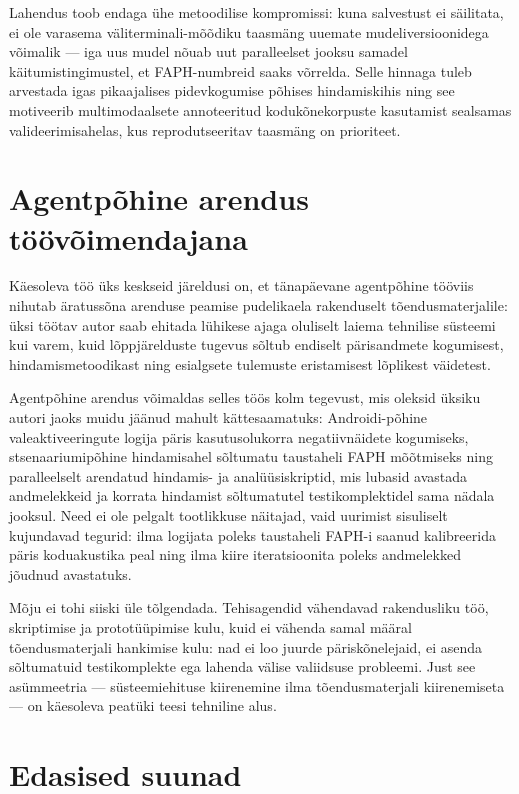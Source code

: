 Lahendus toob endaga ühe metoodilise kompromissi: kuna salvestust ei säilitata, ei ole varasema väliterminali-mõõdiku taasmäng uuemate mudeliversioonidega võimalik --- iga uus mudel nõuab uut paralleelset jooksu samadel käitumistingimustel, et FAPH-numbreid saaks võrrelda. Selle hinnaga tuleb arvestada igas pikaajalises pidevkogumise põhises hindamiskihis ning see motiveerib multimodaalsete annoteeritud kodukõnekorpuste \cite{chen2022misp} kasutamist sealsamas valideerimisahelas, kus reprodutseeritav taasmäng on prioriteet.

\section{Agentpõhine arendus töövõimendajana}

Käesoleva töö üks keskseid järeldusi on, et tänapäevane agentpõhine tööviis nihutab äratussõna arenduse peamise pudelikaela rakenduselt tõendusmaterjalile: üksi töötav autor saab ehitada lühikese ajaga oluliselt laiema tehnilise süsteemi kui varem, kuid lõppjärelduste tugevus sõltub endiselt pärisandmete kogumisest, hindamismetoodikast ning esialgsete tulemuste eristamisest lõplikest väidetest.

Agentpõhine arendus võimaldas selles töös kolm tegevust, mis oleksid üksiku autori jaoks muidu jäänud mahult kättesaamatuks: Androidi-põhine valeaktiveeringute logija päris kasutusolukorra negatiivnäidete kogumiseks, stsenaariumipõhine hindamisahel sõltumatu taustaheli FAPH mõõtmiseks ning paralleelselt arendatud hindamis- ja analüüsiskriptid, mis lubasid avastada andmelekkeid ja korrata hindamist sõltumatutel testikomplektidel sama nädala jooksul. Need ei ole pelgalt tootlikkuse näitajad, vaid uurimist sisuliselt kujundavad tegurid: ilma logijata poleks taustaheli FAPH-i saanud kalibreerida päris koduakustika peal ning ilma kiire iteratsioonita poleks andmelekked jõudnud avastatuks.

Mõju ei tohi siiski üle tõlgendada. Tehisagendid vähendavad rakendusliku töö, skriptimise ja prototüüpimise kulu, kuid ei vähenda samal määral tõendusmaterjali hankimise kulu: nad ei loo juurde päriskõnelejaid, ei asenda sõltumatuid testikomplekte ega lahenda välise valiidsuse probleemi. Just see asümmeetria --- süsteemiehituse kiirenemine ilma tõendusmaterjali kiirenemiseta --- on käesoleva peatüki teesi tehniline alus.

\section{Edasised suunad}
\label{sec:future-directions}

